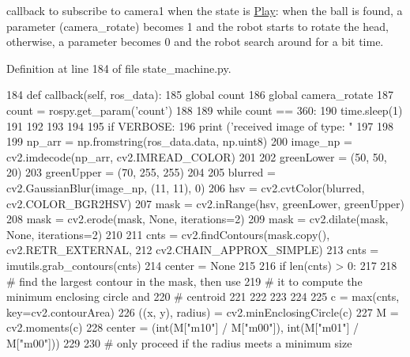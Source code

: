 callback to subscribe to camera1 when the state is \hyperlink{classstate__machine_1_1Play}{Play}\+: when the ball is found, a parameter (camera\+\_\+rotate) becomes 1 and the robot starts to rotate the head, otherwise, a parameter becomes 0 and the robot search around for a bit time. 



Definition at line 184 of file state\+\_\+machine.\+py.


\begin{DoxyCode}
184     \textcolor{keyword}{def }callback(self, ros\_data): 
185         \textcolor{keyword}{global} count 
186         \textcolor{keyword}{global} camera\_rotate
187         count = rospy.get\_param(\textcolor{stringliteral}{'count'}) 
188 
189         \textcolor{keywordflow}{while} count == 360: 
190             time.sleep(1)
191 
192 
193         
194 
195         \textcolor{keywordflow}{if} VERBOSE:
196             \textcolor{keywordflow}{print} (\textcolor{stringliteral}{'received image of type: "%
197 
198         
199         np\_arr = np.fromstring(ros\_data.data, np.uint8)
200         image\_np = cv2.imdecode(np\_arr, cv2.IMREAD\_COLOR)  
201         
202         greenLower = (50, 50, 20)
203         greenUpper = (70, 255, 255)
204         
205         blurred = cv2.GaussianBlur(image\_np, (11, 11), 0)
206         hsv = cv2.cvtColor(blurred, cv2.COLOR\_BGR2HSV)
207         mask = cv2.inRange(hsv, greenLower, greenUpper)
208         mask = cv2.erode(mask, \textcolor{keywordtype}{None}, iterations=2)
209         mask = cv2.dilate(mask, \textcolor{keywordtype}{None}, iterations=2)
210         
211         cnts = cv2.findContours(mask.copy(), cv2.RETR\_EXTERNAL,
212                                 cv2.CHAIN\_APPROX\_SIMPLE)
213         cnts = imutils.grab\_contours(cnts)
214         center = \textcolor{keywordtype}{None}
215         
216         \textcolor{keywordflow}{if} len(cnts) > 0:
217             
218             \textcolor{comment}{# find the largest contour in the mask, then use}
219             \textcolor{comment}{# it to compute the minimum enclosing circle and}
220             \textcolor{comment}{# centroid}
221 
222 
223             
224 
225             c = max(cnts, key=cv2.contourArea)
226             ((x, y), radius) = cv2.minEnclosingCircle(c)
227             M = cv2.moments(c)
228             center = (int(M[\textcolor{stringliteral}{"m10"}] / M[\textcolor{stringliteral}{"m00"}]), int(M[\textcolor{stringliteral}{"m01"}] / M[\textcolor{stringliteral}{"m00"}]))
229 
230             \textcolor{comment}{# only proceed if the radius meets a minimum size}
}
\end{DoxyCode}
